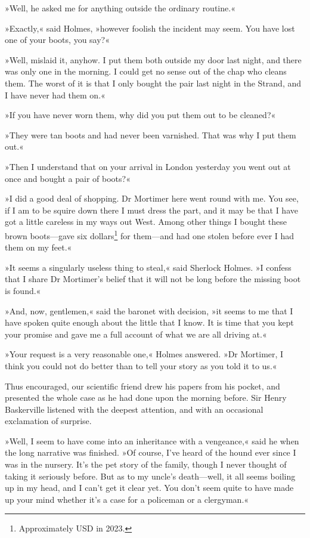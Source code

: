 »Well, he asked me for anything outside the ordinary routine.«

»Exactly,« said Holmes, »however foolish the incident may seem. You have lost one of your boots, you say?«

»Well, mislaid it, anyhow. I put them both outside my door last night, and there was only one in the morning. I could get no sense out of the chap who cleans them. The worst of it is that I only bought the pair last night in the Strand, and I have never had them on.«

»If you have never worn them, why did you put them out to be cleaned?«

»They were tan boots and had never been varnished. That was why I put them out.«

»Then I understand that on your arrival in London yesterday you went out at once and bought a pair of boots?«

»I did a good deal of shopping. Dr Mortimer here went round with me. You see, if I am to be squire down there I must dress the part, and it may be that I have got a little careless in my ways out West. Among other things I bought these brown boots\allowbreak---\allowbreak gave six dollars\footnote{Approximately  USD in 2023.} for them\allowbreak---\allowbreak and had one stolen before ever I had them on my feet.«

»It seems a singularly useless thing to steal,« said Sherlock Holmes. »I confess that I share Dr Mortimer's belief that it will not be long before the missing boot is found.«

»And, now, gentlemen,« said the baronet with decision, »it seems to me that I have spoken quite enough about the little that I know. It is time that you kept your promise and gave me a full account of what we are all driving at.«

»Your request is a very reasonable one,« Holmes answered. »Dr Mortimer, I think you could not do better than to tell your story as you told it to us.«

Thus encouraged, our scientific friend drew his papers from his pocket, and presented the whole case as he had done upon the morning before. Sir Henry Baskerville listened with the deepest attention, and with an occasional exclamation of surprise.

»Well, I seem to have come into an inheritance with a vengeance,« said he when the long narrative was finished. »Of course, I've heard of the hound ever since I was in the nursery. It's the pet story of the family, though I never thought of taking it seriously before. But as to my uncle's death\allowbreak---\allowbreak well, it all seems boiling up in my head, and I can't get it clear yet. You don't seem quite to have made up your mind whether it's a case for a policeman or a clergyman.«

